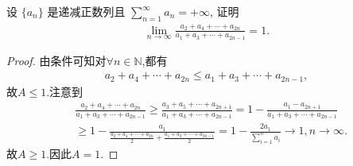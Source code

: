 \documentclass[../../main.tex]{subfiles}%
\begin{document}
\begin{example}
设 $\{a_n\}$ 是递减正数列且 $\sum\limits_{n=1}^{\infty}a_n = +\infty$, 证明
\begin{align*}
\lim_{n\rightarrow \infty}\frac{a_2+a_4+\cdots +a_{2n}}{a_1+a_3+\cdots +a_{2n-1}} = 1.
\end{align*}
\end{example}
\begin{proof}

由条件可知对$\forall n\in \mathbb{N}$,都有
\begin{align*}
a_2+a_4+\cdots +a_{2n}\leqslant a_1+a_3+\cdots +a_{2n-1},
\end{align*}
故$A\leqslant 1$.注意到
\begin{align*}
&\frac{a_2+a_4+\cdots +a_{2n}}{a_1+a_3+\cdots +a_{2n-1}}\geqslant \frac{a_3+a_5+\cdots +a_{2n+1}}{a_1+a_3+\cdots +a_{2n-1}}=1-\frac{a_1-a_{2n+1}}{a_1+a_3+\cdots +a_{2n-1}}
\\
&\geqslant 1-\frac{a_1}{\frac{a_2+a_4+\cdots +a_{2n}}{2}+\frac{a_1+a_3+\cdots +a_{2n-1}}{2}}=1-\frac{2a_1}{\sum\limits_{i=1}^n{a_i}}\rightarrow 1,n\rightarrow \infty .
\end{align*}
故$A\geqslant 1$.因此$A=1$.

\end{proof}
\end{document}
